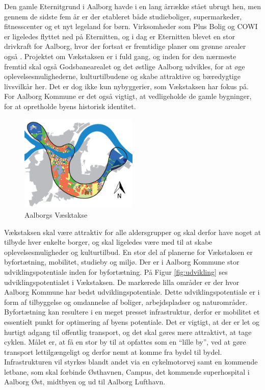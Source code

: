 \newline \indent{     }  Den gamle Eternitgrund i Aalborg havde i en lang årrække stået ubrugt hen, men gennem de sidste fem år er der etableret både studieboliger, supermarkeder, fitnesscenter og et nyt legeland for børn. Virksomheder som Plus Bolig og COWI er ligeledes flyttet ned på Eternitten, og i dag er Eternitten blevet en stor drivkraft for Aalborg,  hvor der fortsat  er fremtidige planer om grønne arealer også \citep{eternitten}.
\newline \indent{     }  Projektet om Vækstaksen er i fuld gang, og inden for den nærmeste fremtid skal også Godsbanearealet og det østlige Aalborg udvikles, for at øge oplevelsesmulighederne, kulturtilbudene og skabe attraktive og bæredygtige livsvilkår her. Det er dog ikke kun nybyggerier, som Vækstaksen har fokus på. For Aalborg Kommune er det også vigtigt, at vedligeholde de gamle bygninger, for at opretholde byens historisk identitet.

\begin{figure}[htbp]
	\centering
	\includegraphics[width=0.5\textwidth]{billeder/vaekstaksen.png}
	\caption{Aalborgs Væsktakse}
	\label{fig:vaekstakse}
\end{figure}

Vækstaksen skal være attraktiv for alle aldersgrupper og skal derfor have noget at tilbyde hver enkelte borger, og skal ligeledes være med til at skabe oplevelsesmuligheder og kulturtilbud.
\newline \indent{     }  En stor del af planerne for Vækstaksen er byfortætning, mobilitet, studieby og miljø. 
Der er i Aalborg Kommune stor udviklingspotentiale inden for byfortætning. På Figur \ref{fig:udvikling} ses udviklingspotentialet i Vækstaksen. De markerede lilla områder er der hvor Aalborg Kommune har bedst udviklingspotentiale.
\newline \indent{     }  Dette udviklingspotentiale er i form af tilbyggelse og omdannelse af boliger, arbejdspladser og naturområder. Byfortætning kan resultere i en meget presset infrastruktur, derfor er mobilitet et essentielt punkt for optimering af byens potentiale. Det er vigtigt, at der er let og hurtigt adgang til offentlig transport, og det skal gøres mere attraktivt, at tage cyklen. Målet er, at få en stor by til at opfattes som en “lille by”, ved at gøre transport lettilgængeligt og derfor nemt at komme fra bydel til bydel. Infrastrukturen vil styrkes blandt andet via en cykelmotorvej samt en kommende letbane, som skal forbinde Østhavnen, Campus, det kommende superhospital i Aalborg Øst, midtbyen og ud til Aalborg Lufthavn.

